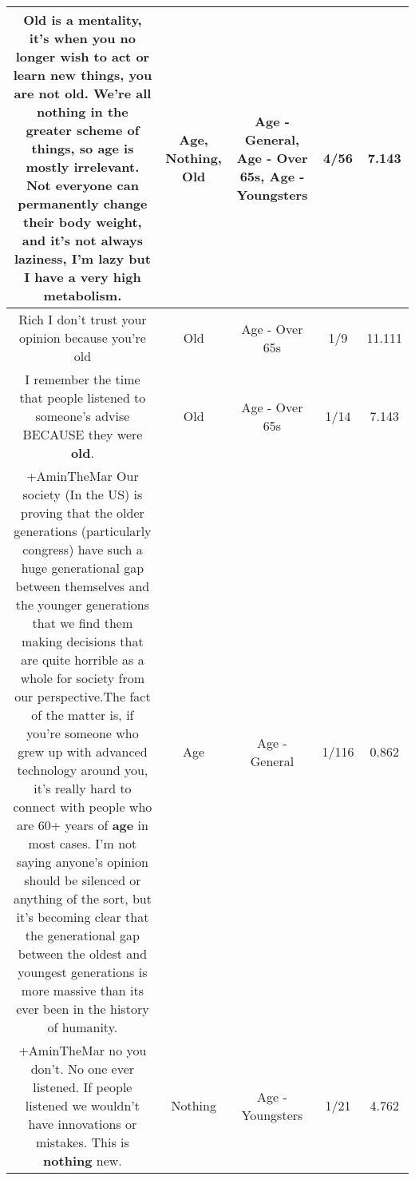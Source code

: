 \documentclass[11pt]{article}
\newlength\mylength
\begin{document}
\begin{center}
\begin{longtable}{|C{.65\mylength}|C{.30\mylength}|C{.12\mylength}|C{.12\mylength}|C{.12\mylength}|}
  \small Old is a mentality, it's when you no longer wish to act or learn new things, you are not \textbf{old}. We're all \textbf{nothing} in the greater scheme of things, so \textbf{age} is mostly irrelevant. Not everyone can permanently change their body weight, and it's not always laziness, I'm lazy but I have a very high metabolism.\normalsize   & Age, Nothing, Old & Age - General, Age - Over 65s, Age - Youngsters & 4/56 & 7.143 \\  \hline
  \small Rich I don't trust your opinion because you're  old\normalsize   & Old & Age - Over 65s & 1/9 & 11.111 \\  \hline
  \small I remember the time that people listened to someone's advise BECAUSE they were \textbf{old}.\normalsize   & Old & Age - Over 65s & 1/14 & 7.143 \\  \hline
  \small +AminTheMar Our society (In the US) is proving that the older generations (particularly congress) have such a huge generational gap between themselves and the younger generations that we find them making decisions that are quite horrible as a whole for society from our perspective.The fact of the matter is, if you're someone who grew up with advanced technology around you, it's really hard to connect with people who are 60+ years of \textbf{age} in most cases. I'm not saying anyone's opinion should be silenced or anything of the sort, but it's becoming clear that the generational gap between the oldest and youngest generations is more massive than its ever been in the history of humanity.\normalsize   & Age & Age - General & 1/116 & 0.862 \\  \hline
  \small +AminTheMar no you don't. No one ever listened. If people listened we wouldn't have innovations or mistakes. This is \textbf{nothing} new.\normalsize   & Nothing & Age - Youngsters & 1/21 & 4.762 \\  \hline

\end{longtable}
\end{center}
\end{document}
